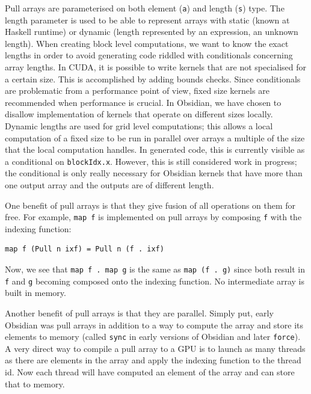 \documentclass[a4paper]{book}
\begin{document}
Pull arrays are parameterised on both element ({\tt a}) and length ({\tt s}) type. The length 
parameter is used to be able to represent arrays with static (known at Haskell runtime) 
or dynamic (length represented by an expression, an unknown length). When creating block 
level computations, we want to know the exact lengths in order to avoid generating code 
riddled with conditionals concerning array lengths. In CUDA, it is possible to write kernels that 
are not specialised for a certain size. This is accomplished by adding bounds checks. Since 
conditionals  are problematic from a performance point of view, fixed size kernels are recommended 
when performance is crucial. In Obsidian, we have chosen to disallow implementation of kernels 
that operate on different sizes locally.  Dynamic lengths are used for grid level computations; 
this allows a local computation of a fixed size to be run in parallel over arrays a multiple
of the size that the local computation handles. In generated code, this is currently visible 
as a conditional on {\tt blockIdx.x}. However, this is still considered work in progress; the 
conditional is only really necessary for Obsidian kernels that have more than one output array 
and the outputs are of different length. 

One benefit of pull arrays is that they give fusion of all operations on them for free. 
For example, {\tt map f} is implemented on pull arrays by composing {\tt f} with the indexing function: 

\begin{verbatim} 
map f (Pull n ixf) = Pull n (f . ixf)
\end{verbatim}

Now, we see that \verb!map f . map g! is the same as \verb!map (f . g)! since both result in {\tt f}
and {\tt g} becoming composed onto the indexing function. No intermediate array is built in 
memory.  

Another benefit of pull arrays is that they are parallel. Simply put, early Obsidian was pull 
arrays in addition to a way to compute the array and store its elements to memory 
(called {\tt sync} in early versions of Obsidian and later {\tt force}). A very 
direct way to compile a pull array to a GPU is to launch as many threads as there are 
elements in the array and apply the indexing function to the thread id. Now each thread 
will have computed an element of the array and can store that to memory. 
\end{document}
